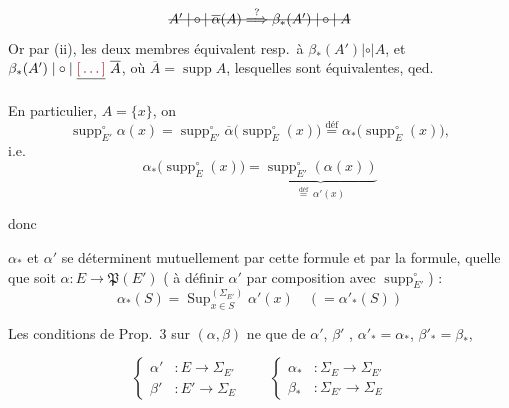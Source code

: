 \documentclass[11pt,a4paper]{article}
\begin{document}

\[
  \text{\struck{$A' \mathrel{|\circ|} \overline{\alpha}(A) \overset{?}{\Longrightarrow} \beta_{*}(A') \mathrel{|\circ|} A$}}
\]
Or par (ii), les deux membres équivalent resp.\ à $\beta_{*}(A') \mathrel{|\circ|} A$, et $\beta_{*}(A') \mathrel{|\circ|} \struck{\ill{}}\ \overline{A}$, où $\overline{A} = \operatorname{supp} A$, lesquelles sont  équivalentes, qed.

En particulier, \struck{\ill{}}  $A = \{x\}$, on 
\[
  \operatorname{supp}^{\circ}_{E'} \alpha(x) = \operatorname{supp}^{\circ}_{E'} \overline{\alpha}\bigl(\operatorname{supp}^{\circ}_E(x)\bigr) \overset{\text{déf}}{=} \alpha_{*}\bigl(\operatorname{supp}^{\circ}_E(x)\bigr) ,
\]
i.e.
\[
  \boxed{\ \alpha_{*}\bigl(\operatorname{supp}^{\circ}_E(x)\bigr) = \underbrace{\operatorname{supp}^{\circ}_{E'}(\alpha(x))}_{\overset{\text{déf}}{=}\ \alpha'(x)}\ }
\]

donc 

$\alpha_{*}$ et $\alpha'$ se déterminent mutuellement par cette formule et par la formule,  quelle que soit $\alpha : E \to \mathfrak{P}(E')$ ( à définir $\alpha'$ par composition  avec $\operatorname{supp}^{\circ}_{E'}$) :
\[
  \boxed{\ \alpha_{*}(S) = \operatorname{Sup}_{x \in S}^{(\Sigma_{E'})} \alpha'(x) \quad (= \alpha'_{*}(S))\ }
\]

Les conditions de Prop.~3 sur $(\alpha, \beta)$ ne  que de $\alpha'$, $\beta'$ ,    $\alpha'_{*} = \alpha_{*}$, $\beta'_{*} = \beta_{*}$,


\[
  \left\{
  \begin{aligned}
    \alpha' &: E \to \Sigma_{E'} \\
    \beta' &: E' \to \Sigma_E
  \end{aligned}
  \right.
  \qquad
  \left\{
  \begin{aligned}
    \alpha_{*} &: \Sigma_E \to \Sigma_{E'} \\
    \beta_{*} &: \Sigma_{E'} \to \Sigma_E
  \end{aligned}
  \right.
\]
\end{document}
